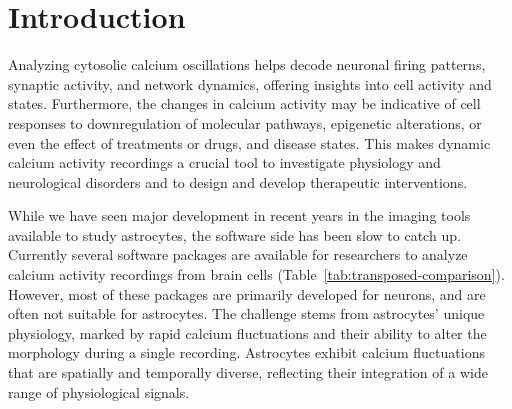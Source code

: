 \documentclass[utf8]{FrontiersinHarvard}
\newcommand{\tref}[1]{ (Table~\ref{tab:#1})}
\begin{document}
    \begin{acronym}
    \end{acronym}


    \section{Introduction}
    Analyzing cytosolic calcium oscillations helps decode neuronal firing patterns, synaptic activity, and network dynamics, offering insights into cell activity and states\citep{del_negro_sodium_2005,grienberger_imaging_2012,dombeck_imaging_2007}. Furthermore, the changes in calcium activity may be indicative of cell responses to downregulation of molecular pathways, epigenetic alterations, or even the effect of treatments or drugs, and disease states\citep{lines_astrocytes_2020,miller_calcium_2023,robil_glioblastoma_2015,huang_vitro_2013,britti_tau_2020,zhang_estrogen_2010}. This makes dynamic calcium activity recordings a crucial tool to investigate physiology and neurological disorders and to design and develop therapeutic interventions.

    While we have seen major development in recent years in the imaging tools available to study astrocytes, the software side has been slow to catch up\citep{gorzo_photonics_2022,aryal_er-gcamp6f_2022,stobart_cortical_2018}. Currently several software packages are available for researchers to analyze calcium activity recordings from brain cells\tref{transposed-comparison}. However, most of these packages are primarily developed for neurons, and are often not suitable for astrocytes. The challenge stems from astrocytes' unique physiology, marked by rapid  calcium fluctuations\citep{stobart_long-term_2018,curreli_complementary_2022} and their ability to alter the morphology during a single recording\citep{anders_epileptic_2024,baorto_astrocyte_1992}. Astrocytes exhibit calcium fluctuations that are spatially and temporally diverse, reflecting their integration of a wide range of physiological signals\citep{semyanov_making_2020,smedler_frequency_2014,denizot_simulation_2019,papouin_astrocytic_2017,bazargani_astrocyte_2016}.
\end{document}
